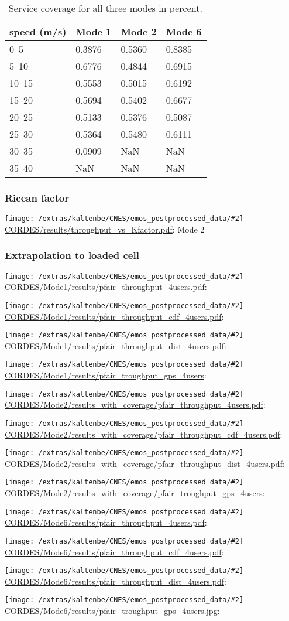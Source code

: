 \documentclass[a4paper,10pt]{article}
\newcommand{\printfile}[2][]{
 \begin{minipage}{8cm}
  \centering
  \texttt{[image: /extras/kaltenbe/CNES/emos\_postprocessed\_data/\#2]}
  \url{#2}: #1

 \end{minipage}
}
\begin{document}
\begin{table}
\centering
\begin{tabular}{l|l|l|l}
speed (m/s) & Mode 1 & Mode 2 & Mode 6\\
\hline
0--5   &   0.3876  &  0.5360 &   0.8385\\
5--10  &   0.6776  &  0.4844 &   0.6915\\
10--15 &   0.5553  &  0.5015 &   0.6192\\
15--20 &   0.5694  &  0.5402 &   0.6677\\
20--25 &   0.5133  &  0.5376 &   0.5087\\
25--30 &   0.5364  &  0.5480 &   0.6111\\
30--35 &   0.0909  &     NaN &      NaN\\
35--40 &      NaN  &     NaN &      NaN\\
\end{tabular}
\caption{Service coverage for all three modes in percent.}
\end{table}

\subsubsection{Ricean factor}

\printfile[Mode 2]{CORDES/results/throughput_vs_Kfactor.pdf}

\subsubsection{Extrapolation to loaded cell}

\printfile{CORDES/Mode1/results/pfair_throughput_4users.pdf}
\printfile{CORDES/Mode1/results/pfair_throughput_cdf_4users.pdf}

\printfile{CORDES/Mode1/results/pfair_throughput_dist_4users.pdf}
\printfile{CORDES/Mode1/results/pfair_troughput_gps_4users}

\printfile{CORDES/Mode2/results_with_coverage/pfair_throughput_4users.pdf}
\printfile{CORDES/Mode2/results_with_coverage/pfair_throughput_cdf_4users.pdf}

\printfile{CORDES/Mode2/results_with_coverage/pfair_throughput_dist_4users.pdf}
\printfile{CORDES/Mode2/results_with_coverage/pfair_troughput_gps_4users}

\printfile{CORDES/Mode6/results/pfair_throughput_4users.pdf}
\printfile{CORDES/Mode6/results/pfair_throughput_cdf_4users.pdf}

\printfile{CORDES/Mode6/results/pfair_throughput_dist_4users.pdf}
\printfile{CORDES/Mode6/results/pfair_troughput_gps_4users.jpg}
\end{document}

